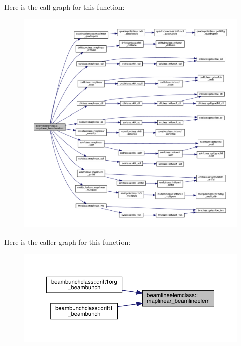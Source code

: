 Here is the call graph for this function\+:\nopagebreak
\begin{figure}[H]
\begin{center}
\leavevmode
\includegraphics[width=350pt]{namespacebeamlineelemclass_a76cac49c6e8615751de8c9f8bbba2641_cgraph}
\end{center}
\end{figure}
Here is the caller graph for this function\+:\nopagebreak
\begin{figure}[H]
\begin{center}
\leavevmode
\includegraphics[width=350pt]{namespacebeamlineelemclass_a76cac49c6e8615751de8c9f8bbba2641_icgraph}
\end{center}
\end{figure}
\mbox{\label{namespacebeamlineelemclass_a2475c641494686c9c9688a8b15975cbf}} 

